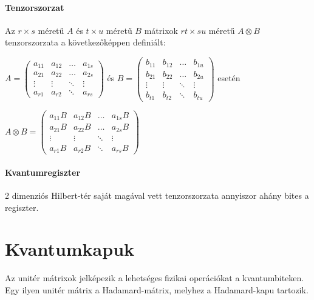 \paragraph{Tenzorszorzat} Az $r \times s$ méretű $A$ és $t \times u$ méretű $B$
mátrixok $rt \times su$ méretű $A \otimes B$ tenzorszorzata a következőképpen
definiált:

\begin{center}
  $A = \begin{pmatrix}
      a_{11} & a_{12} & \dots  & a_{1s} \\
      a_{21} & a_{22} & \dots  & a_{2s} \\
      \vdots & \vdots & \ddots & \vdots \\
      a_{r1} & a_{r2} & \ddots & a_{rs}
    \end{pmatrix}
  $
  és
  $B = \begin{pmatrix}
      b_{11} & b_{12} & \dots  & b_{1u} \\
      b_{21} & b_{22} & \dots  & b_{2u} \\
      \vdots & \vdots & \ddots & \vdots \\
      b_{t1} & b_{t2} & \ddots & b_{tu}
    \end{pmatrix}
  $ esetén
\end{center}

\begin{center}
  $A \otimes B = \begin{pmatrix}
      a_{11}B & a_{12}B & \dots  & a_{1s}B \\
      a_{21}B & a_{22}B & \dots  & a_{2s}B \\
      \vdots  & \vdots  & \ddots & \vdots  \\
      a_{r1}B & a_{r2}B & \ddots & a_{rs}B
    \end{pmatrix}
  $
\end{center}


\paragraph{Kvantumregiszter}

2 dimenziós Hilbert-tér saját magával vett tenzorszorzata annyiszor ahány bites
a regiszter.

\section{Kvantumkapuk}

Az unitér mátrixok jelképezik a lehetséges fizikai operációkat a
kvantumbiteken. Egy ilyen unitér mátrix a Hadamard-mátrix, melyhez a
Hadamard-kapu tartozik.

